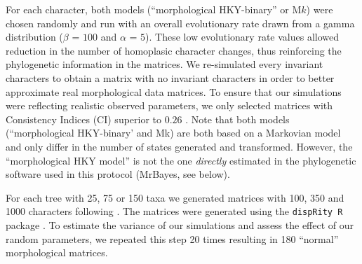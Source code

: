 \documentclass[12pt,letterpaper]{article}
\begin{document}
\noindent For each character, both models (``morphological HKY-binary'' or M$k$) were chosen randomly and run with an overall evolutionary rate drawn from a gamma distribution ($\beta$ = $100$ and $\alpha$ = $5$).
These low evolutionary rate values allowed reduction in the number of homoplasic character changes, thus reinforcing the phylogenetic information in the matrices.
We re-simulated every invariant characters to obtain a matrix with no invariant characters in order to better approximate real morphological data matrices.
To ensure that our simulations were reflecting realistic observed parameters, we only selected matrices with Consistency Indices (CI) superior to $0.26$ \citep{sanderson1989patterns,OReilly20160081}.
Note that both models (``morphological HKY-binary' and Mk) are both based on a Markovian model and only differ in the number of states generated and transformed.
However, the ``morphological HKY model'' is not the one \textit{directly} estimated in the phylogenetic software used in this protocol (MrBayes, see below).

For each tree with 25, 75 or 150 taxa we generated matrices with 100, 350 and 1000 characters following \cite{OReilly20160081}.
The matrices were generated using the \texttt{dispRity R} package \citep{thomas_guillerme_2016_55646}.
To estimate the variance of our simulations and assess the effect of our random parameters, we repeated this step 20 times resulting in 180 ``normal'' morphological matrices.
\end{document}
